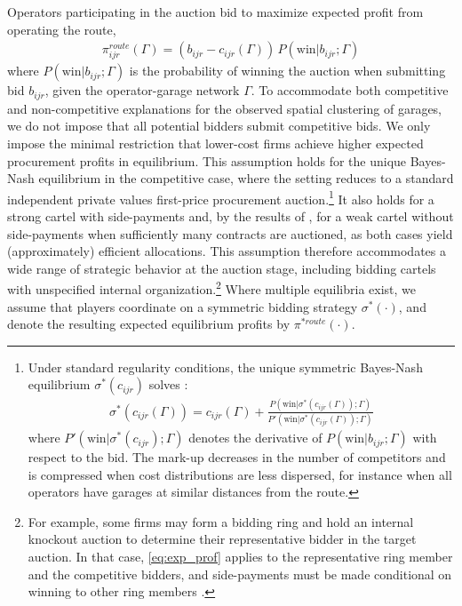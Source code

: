 \documentclass[12pt]{article}
\begin{document}
Operators participating in the auction bid to maximize expected profit from 
operating the route,
\begin{align}\label{eq:exp_prof}
\pi_{ijr}^{route}(\Gamma) = (b_{ijr} - c_{ijr}(\Gamma))\,P(\text{win}|b_{ijr};\Gamma)
\end{align}
where $P(\text{win}|b_{ijr};\Gamma)$ is the probability of winning the auction 
when submitting bid $b_{ijr}$, given the operator-garage network $\Gamma$. To 
accommodate both competitive and non-competitive explanations for the observed 
spatial clustering of garages, we do not impose that all potential bidders submit competitive bids. 
We only impose the minimal restriction that lower-cost firms achieve higher 
expected procurement profits in equilibrium. This assumption holds for the 
unique Bayes-Nash equilibrium in the competitive case, where the setting 
reduces to a standard independent private values first-price procurement 
auction.\footnote{Under standard regularity conditions, the unique symmetric 
Bayes-Nash equilibrium $\sigma^*(c_{ijr})$ solves \citep{guerre2000optimal}:
\begin{align}\label{eq:eqbid}
\sigma^*(c_{ijr}(\Gamma)) = c_{ijr}(\Gamma) + 
\frac{P(\text{win}|\sigma^*(c_{ijr}(\Gamma));\Gamma)}
{P'(\text{win}|\sigma^*(c_{ijr}(\Gamma));\Gamma)}
\end{align}
where $P'(\text{win}|\sigma^*(c_{ijr});\Gamma)$ denotes the derivative of 
$P(\text{win}|b_{ijr};\Gamma)$ with respect to the bid. The mark-up 
decreases in the number of competitors and is compressed when cost 
distributions are less dispersed, for instance when all operators have garages 
at similar distances from the route.} It also holds for a strong cartel with 
side-payments and, by the results of \cite{Pesendorfer2000study}, for a weak 
cartel without side-payments when sufficiently many contracts are auctioned, 
as both cases yield (approximately) efficient allocations. This assumption 
therefore accommodates a wide range of strategic behavior at the auction stage, 
including bidding cartels with unspecified internal organization.\footnote{For 
example, some firms may form a bidding ring and hold an internal knockout 
auction to determine their representative bidder in the target auction. In that 
case, \eqref{eq:exp_prof} applies to the representative ring member and the 
competitive bidders, and side-payments must be made conditional on winning to 
other ring members \citep[see e.g.,][]{mcafee1992bidding,Pesendorfer2000study,
Asker2010study}.} Where multiple equilibria exist, we assume that players 
coordinate on a symmetric bidding strategy $\sigma^*(\cdot)$, and denote the 
resulting expected equilibrium profits by $\pi^{*route}(\cdot)$.
\end{document}
